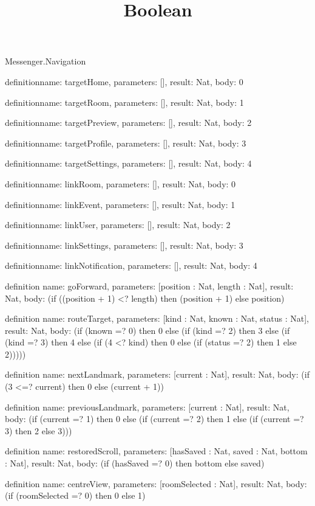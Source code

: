 \begin{lexlean}{Messenger.Navigation}
\title{Boolean}
\begin{semanticmodule}
definition{name: targetHome, parameters: [], result: Nat, body: 0}

definition{name: targetRoom, parameters: [], result: Nat, body: 1}

definition{name: targetPreview, parameters: [], result: Nat, body: 2}

definition{name: targetProfile, parameters: [], result: Nat, body: 3}

definition{name: targetSettings, parameters: [], result: Nat, body: 4}

definition{name: linkRoom, parameters: [], result: Nat, body: 0}

definition{name: linkEvent, parameters: [], result: Nat, body: 1}

definition{name: linkUser, parameters: [], result: Nat, body: 2}

definition{name: linkSettings, parameters: [], result: Nat, body: 3}

definition{name: linkNotification, parameters: [], result: Nat, body: 4}

definition{
  name: goForward,
  parameters: [position : Nat, length : Nat],
  result: Nat,
  body: (if ((position + 1) <? length) then (position + 1) else position)
}

definition{
  name: routeTarget,
  parameters: [kind : Nat, known : Nat, status : Nat],
  result: Nat,
  body: (if (known =? 0) then 0 else (if (kind =? 2) then 3 else (if (kind =? 3) then 4 else (if (4 <? kind) then 0 else (if (status =? 2) then 1 else 2)))))
}

definition{
  name: nextLandmark,
  parameters: [current : Nat],
  result: Nat,
  body: (if (3 <=? current) then 0 else (current + 1))
}

definition{
  name: previousLandmark,
  parameters: [current : Nat],
  result: Nat,
  body: (if (current =? 1) then 0 else (if (current =? 2) then 1 else (if (current =? 3) then 2 else 3)))
}

definition{
  name: restoredScroll,
  parameters: [hasSaved : Nat, saved : Nat, bottom : Nat],
  result: Nat,
  body: (if (hasSaved =? 0) then bottom else saved)
}

definition{
  name: centreView,
  parameters: [roomSelected : Nat],
  result: Nat,
  body: (if (roomSelected =? 0) then 0 else 1)
}


\end{semanticmodule}
\end{lexlean}
